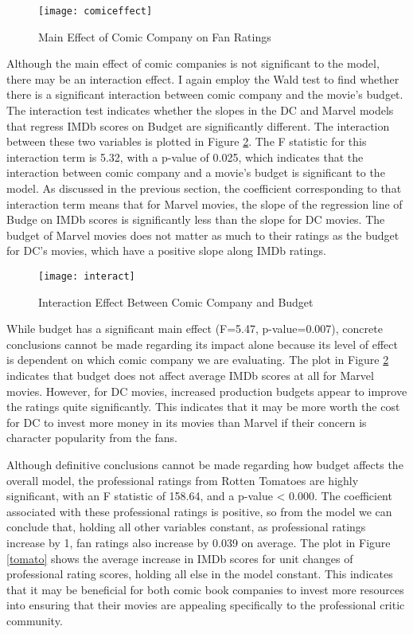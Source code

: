 \documentclass{svproc}
\begin{document}
\begin{figure}
\begin{center}
\caption{Main Effect of Comic Company on Fan Ratings}
\medskip
\texttt{[image: comiceffect]}
\label{comiceffect}
\smallskip
\end{center}
\end{figure}

Although the main effect of comic companies is not significant to the model, there may be an interaction effect. I again employ the Wald test to find whether there is a significant interaction between comic company and the movie's budget. The interaction test indicates whether the slopes in the DC and Marvel models that regress IMDb scores on Budget are significantly different. The interaction between these two variables is plotted in Figure \ref{interact}. The F statistic for this interaction term is 5.32, with a p-value of 0.025, which indicates that the interaction between comic company and a movie's budget is significant to the model. As discussed in the previous section, the coefficient corresponding to that interaction term means that for Marvel movies, the slope of the regression line of Budge on IMDb scores is significantly less than the slope for DC movies. The budget of Marvel movies does not matter as much to their ratings as the budget for DC's movies, which have a positive slope along IMDb ratings. 

\begin{figure}
\begin{center}
\caption{Interaction Effect Between Comic Company and Budget}
\medskip
\texttt{[image: interact]}
\label{interact}
\smallskip
\end{center}
\end{figure}

While budget has a significant main effect (F=5.47, p-value=0.007), concrete conclusions cannot be made regarding its impact alone because its level of effect is dependent on which comic company we are evaluating. The plot in Figure \ref{interact} indicates that budget does not affect average IMDb scores at all for Marvel movies. However, for DC movies, increased production budgets appear to improve the ratings quite significantly. This indicates that it may be more worth the cost for DC to invest more money in its movies than Marvel if their concern is character popularity from the fans.

Although definitive conclusions cannot be made regarding how budget affects the overall model, the professional ratings from Rotten Tomatoes are highly significant, with an F statistic of 158.64, and a p-value < 0.000. The coefficient associated with these professional ratings is positive, so from the model we can conclude that, holding all other variables constant, as professional ratings increase by 1, fan ratings also increase by 0.039 on average. The plot in Figure \ref{tomato} shows the average increase in IMDb scores for unit changes of professional rating scores, holding all else in the model constant. This indicates that it may be beneficial for both comic book companies to invest more resources into ensuring that their movies are appealing specifically to the professional critic community. 
\end{document}
